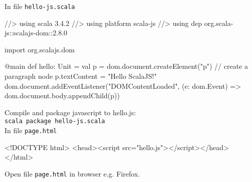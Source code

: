 \documentclass[article, a5paper]{memoir}
\makeatletter
\newcommand{\LangColor}{scalared}
\newcommand{\mc}[1]{\multicolumn{2}{l}{\hspace{-0.65em}\parbox[t]{102mm}{\small #1}}}
\newcommand{\head}[1]{{\bfseries {\color{\LangColor}{#1}}\par\vspace{1mm}\hrule\vspace{-2mm}}}
\newenvironment{etab}%
{\begin{ctabular}{@{}>{\raggedright\small}p{25mm} @{}>{\raggedright\small}p{45mm} @{}>{\raggedright\arraybackslash\small}p{57mm}}}
{\end{ctabular}}%
\newcommand{\subsecend}{\\ \\[-2mm]}
\newcommand{\code}{\lstinline[basicstyle=\ttfamily]}
\newcommand{\Newline}{\vspace{\baselineskip}}
\newcommand{\Comment}[1]{{\color{commentgreen}{#1}}}
\makeatother
\begin{document}





\Newline\vspace*{0.0em}\head{Create a single page web app using ScalaJS}\Newline
{\small
In file \texttt{hello-js.scala} 
\begin{Code}
//> using scala 3.4.2
//> using platform scala-js
//> using dep org.scala-js::scalajs-dom::2.8.0

import org.scalajs.dom

@main def hello: Unit = 
  val p = dom.document.createElement("p")  // create a paragraph node
  p.textContent = "Hello ScalaJS!"
  dom.document.addEventListener("DOMContentLoaded", 
    (e: dom.Event) => dom.document.body.appendChild(p))
\end{Code}
Compile and package javascript to hello.js:\\ \texttt{scala package hello-js.scala}\\[0.5em]
In file \texttt{page.html}
\begin{Code}
<!DOCTYPE html>
<head><script src="hello.js"></script></head>
</html>
\end{Code}
Open file \code{page.html} in browser e.g. Firefox.
}


\end{document}

